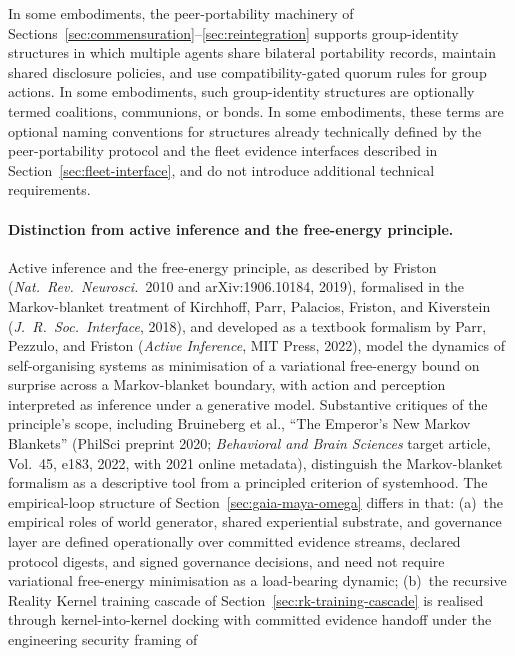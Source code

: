 \documentclass[a4paper,12pt]{article}
\newcommand{\RK}{Reality Kernel\xspace}
\begin{document}

In some embodiments, the peer-portability machinery of
Sections~\ref{sec:commensuration}--\ref{sec:reintegration}
supports group-identity structures in which multiple agents share
bilateral portability records, maintain shared disclosure policies,
and use compatibility-gated quorum rules for group actions. In some
embodiments, such group-identity structures are optionally termed
coalitions, communions, or bonds. In some embodiments, these terms are
optional naming conventions for structures already technically defined
by the peer-portability protocol and the fleet evidence interfaces
described in Section~\ref{sec:fleet-interface}, and do not introduce
additional technical requirements.

\paragraph{Distinction from active inference and the free-energy
principle.}
Active inference and the free-energy principle, as described by
Friston (\emph{Nat.\ Rev.\ Neurosci.}~2010 and arXiv:1906.10184,
2019), formalised in the Markov-blanket treatment of Kirchhoff,
Parr, Palacios, Friston, and Kiverstein (\emph{J.\ R.\ Soc.\
Interface}, 2018), and developed as a textbook formalism by
Parr, Pezzulo, and Friston (\emph{Active Inference}, MIT
Press, 2022), model the dynamics of self-organising systems as
minimisation of a variational free-energy bound on surprise
across a Markov-blanket boundary, with action and perception
interpreted as inference under a generative model. Substantive
critiques of the principle's scope, including Bruineberg
et al., ``The Emperor's New Markov Blankets'' (PhilSci preprint
2020; \emph{Behavioral and Brain Sciences} target article,
Vol.~45, e183, 2022, with 2021 online metadata), distinguish
the Markov-blanket formalism as a descriptive tool from a
principled criterion of systemhood. The empirical-loop structure
of Section~\ref{sec:gaia-maya-omega} differs in that: (a)~the
empirical roles of world generator, shared experiential
substrate, and governance layer are defined operationally over
committed evidence streams, declared protocol digests, and
signed governance decisions, and need not require variational
free-energy minimisation as a load-bearing dynamic;
(b)~the recursive \RK training cascade of
Section~\ref{sec:rk-training-cascade} is realised through
kernel-into-kernel docking with committed evidence handoff under
the engineering security framing of
\end{document}
